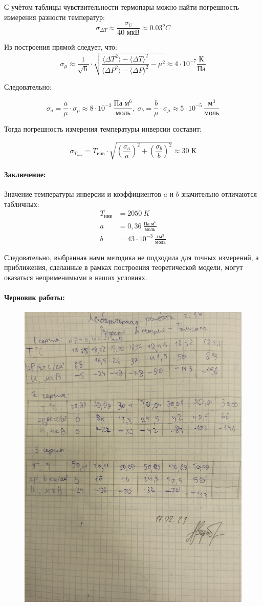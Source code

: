 \documentclass[a4paper, 12pt]{article}
\newcommand{\parag}[1]{\paragraph*{#1:}}
\begin{document}
С учётом таблицы чувствительности термопары можно найти погрешность измерения разности температур:
\[\sigma_{\Delta T} \approx \frac{\sigma_U}{40 \text{ мкВ}} \approx 0.03^o C\]

Из построения прямой следует, что:
\[
    \sigma_{\mu} \approx \frac{1}{\sqrt{6}} \cdot \sqrt{\frac{\langle \Delta T^2 \rangle  - \langle \Delta T \rangle^2}{\langle \Delta P^2 \rangle  - \langle \Delta P \rangle^2} - \mu^2} \approx 4 \cdot 10^{-7} \frac{\text{К}}{\text{Па}}
\]

Следовательно:

\[\sigma_a = \frac{a}{\mu} \cdot \sigma_{\mu} \approx 8 \cdot 10^{-2} ~\frac{\text{Па м$^6$}}{\text{моль}},~ \sigma_b = \frac{b}{\mu} \cdot \sigma_{\mu} \approx 5 \cdot 10^{-5} ~\frac{\text{м}^3}{\text{моль}}\]

Тогда погрешность измерения температуры инверсии составит:

\[\sigma_{T_{\text{инв}}} = T_{\text{инв}} \cdot \sqrt{\left(\frac{\sigma_a}{a}\right)^2 + \left(\frac{\sigma_b}{b}\right)^2} \approx 30 \text{ К}\]

\parag{Заключение} Значение температуры инверсии и коэффициентов $a$ и $b$ значительно отличаются табличных:
\begin{align*}
    T_{\text{инв}} &= 2050~K \\
    a &= 0,36 ~\frac{\text{Па м}^6}{\text{моль}} \\
    b &= 43 \cdot 10^{-3} ~\frac{\text{см}^3}{\text{моль}}
\end{align*}

Следовательно, выбранная нами методика не подходила для точных измерений, а приближения, сделанные в рамках построения теоретической модели, могут оказаться неприменимыми в наших условиях.

\newpage
\parag{Черновик работы}

\begin{figure}[!h]
    \includegraphics[scale = 0.12, angle = 270]{BlackPaper.jpg}    
\end{figure}
\end{document}
